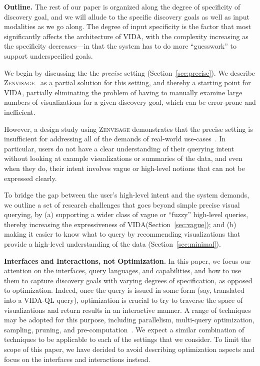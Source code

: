 \documentclass[11pt]{article}
\newcommand{\stitle}[1]{\par\noindent\textbf{#1}}
\newcommand{\zv}{\textsc{Zenvisage}\xspace}
\newcommand{\vida}{\textsc{VIDA}\xspace}
\newcommand{\vidaql}{\textsc{VIDA-QL}\xspace}
\begin{document}
\par \stitle{Outline.}
The rest of our paper is organized along the degree of specificity
of discovery goal, and we will allude to the specific discovery
goals as well as input modalities as we go along. 
The degree of input specificity is the factor
that most significantly affects the architecture of \vida,
with the complexity increasing as the specificity decreases---in that
the system has to do more ``guesswork'' to support underspecified goals. 

\par We begin by discussing the 
the {\em precise} setting (Section~\ref{sec:precise}).
We describe \zv~\cite{Siddiqui2016} 
as a partial solution for
this setting, and thereby a starting point for \vida,
partially eliminating the problem
of having to manually examine large numbers 
of visualizations for a given discovery goal, 
which can be error-prone and inefficient.

\par However, a design study using \zv demonstrates
that the precise setting is insufficient for
addressing all of the demands of real-world use-cases~\cite{Lee2017}.
In particular, users do not have
a clear understanding of their querying intent without looking at example visualizations or summaries of the data, and even when they do, their intent involves
vague or high-level notions that can not be expressed clearly.

\par To bridge the gap between the user's high-level
intent and the system demands,
we outline a set of research challenges
that goes beyond simple precise visual querying, by
(a) supporting a wider class of vague or ``fuzzy'' high-level
queries, thereby increasing the expressiveness
of \vida (Section~\ref{sec:vague});
and 
(b) making it easier to know what to query
by recommending visualizations that provide
a high-level understanding of the data (Section~\ref{sec:minimal}).

\stitle{Interfaces and Interactions, not Optimization.}
In this paper, we focus our attention on the interfaces,
query languages, and capabilities, 
and how to use them to capture discovery goals
with varying degrees of specification, as opposed to optimization.
Indeed, once the query is issued in some form 
(say, translated into a \vidaql
query),
optimization is crucial to try to traverse the space 
of visualizations and return results in an interactive manner.
A range of techniques may be adopted for this purpose,
including parallelism, multi-query optimization, sampling,
pruning, and pre-computation~\cite{Siddiqui2016,Vartak2015}.
We expect a similar combination of techniques to be applicable to
each of the settings that we consider. To limit the scope of this paper, we have
decided to avoid describing optimization aspects and focus on the interfaces and interactions instead.
\end{document}
